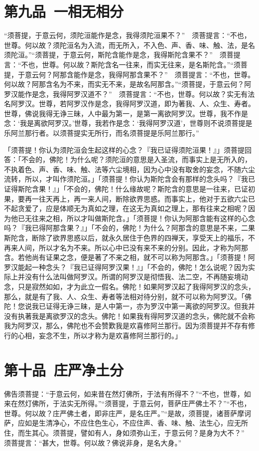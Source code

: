 \documentclass[12pt,twoside,openany]{book}
\newcommand{\kai}[1]{{\CJKfamily{kai}#1}}
\begin{document}
\chapter{第九品\ 一相无相分}
“须菩提，于意云何，须陀洹能作是念，我得须陀洹果不？”　须菩提言：“不也，世尊。何以故？须陀洹名为入流，而无所入，不入色、声、香、味、触、法，是名须陀洹。”“须菩提，于意云何，斯陀含能作是念，我得斯陀含果不？”　须菩提言：“不也，世尊。何以故？斯陀含名一往来，而实无往来，是名斯陀含。”“须菩提，于意云何？阿那含能作是念，我得阿那含果不？”　须菩提言：“不也，世尊。何以故？阿那含名为不来，而实无不来，是故名阿那含。”“须菩提，于意云何？阿罗汉能作是念，我得阿罗汉道不？”　须菩提言：“不也，世尊。何以故？实无有法名阿罗汉。世尊，若阿罗汉作是念，我得阿罗汉道，即为著我、人、众生、寿者。世尊，佛说我得无诤三昧，人中最为第一，是第一离欲阿罗汉。世尊，我不作是念：‘我是离欲阿罗汉。’世尊，我若作是念：‘我得阿罗汉道’，世尊则不说须菩提是乐阿兰那行者。以须菩提实无所行，而名须菩提是乐阿兰那行。”

\kai{「须菩提！你认为须陀洹会生起这样的心念？『我已证得须陀洹果！』」须菩提回答：「不会的，佛陀！为什么呢？须陀洹的意思是入圣流，而事实上是无所入的，不执着色、声、香、味、触、法等六尘境相，因为心中没有取舍的妄念，不随六尘流转，所以，才叫作须陀洹。」「须菩提！你认为斯陀含会有那样的念头吗？『我已证得斯陀含果！』」「不会的，佛陀！什么缘故呢？斯陀含的意思是一往来，已证初果，要再一往天再上，再一来人间，断除欲界思惑。而事实上，他对于五欲六尘已不起贪爱了，应是体顺无为真如之理，在这无为真如之理上，那有往来之相呢？因为他已无往来之相，所以才叫做斯陀含。」「须菩提！你认为阿那含能有这样的心念吗？『我已得阿那含果？』」「不会的，佛陀！为什么？阿那含的意思是不来，二果斯陀含，断除了欲界思惑以后，就永久居住于色界的四禅天，享受天上的福乐，不再来人间，所以才名为不来。所以心中已没有来不来的分别。因此，才称为阿那含。若他尚有证果之念，便是著了不来之相，就不可以称为阿那含。」「须菩提！阿罗汉能起一种念头？『我已证得阿罗汉果！』」「不会的，佛陀！怎么说呢？因为实际上并没有什么法叫做阿罗汉。所谓的阿罗汉是彻悟我、法二空，不再随妄境动念，只是寂然如如，才为此立一假名。佛陀！如果阿罗汉起了我得阿罗汉的念头，那么，就是有了我、人、众生、寿者等法相对待分别，就不可以称为阿罗汉。「佛陀！您说我已证得无诤三昧，是人中第一，亦为罗汉中第一离欲的阿罗汉。但我并没有执著我是离欲罗汉的念头。佛陀！如果我有得阿罗汉道的念头，佛陀就不会称我为阿罗汉，那么，佛陀也不会赞歎我是欢喜修阿兰那行。因为须菩提并不存有修行的心相，妄念不生，所以才称为是欢喜修阿兰那行的。」}

\chapter{第十品\ 庄严净土分}
佛告须菩提：“于意云何，如来昔在然灯佛所，于法有所得不？”“不也，世尊，如来在然灯佛所，于法实无所得。”“须菩提，于意云何，菩萨庄严佛土不？”“不也，世尊。何以故？庄严佛土者，即非庄严，是名庄严。”“是故，须菩提，诸菩萨摩诃萨，应如是生清净心，不应住色生心，不应住声、香、味、触、法生心，应无所住，而生其心。须菩提，譬如有人，身如须弥山王，于意云何？是身为大不？”　须菩提言：“甚大，世尊。何以故？佛说非身，是名大身。”
\end{document}
